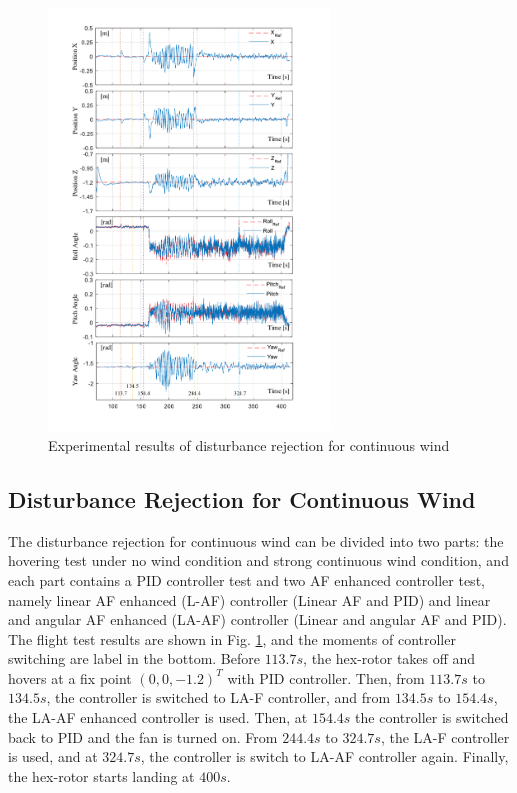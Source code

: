 \documentclass[letterpaper, 10 pt, conference]{ieeeconf}  %
\begin{document}
\begin{figure}[t]
    \centering
    \includegraphics[width=2.95in]{illustrations/fig14.pdf}
    \caption{ Experimental results of disturbance rejection for continuous wind}
    \label{f14}
\end{figure}

\subsection{Disturbance Rejection for Continuous Wind}

The disturbance rejection for continuous wind can be divided into two parts: the hovering test under no wind condition and strong continuous wind condition, and each part contains a PID controller test and two AF enhanced controller test, namely linear AF enhanced (L-AF) controller (Linear AF and PID) and linear and angular AF enhanced (LA-AF) controller (Linear and angular AF and PID).
The flight test results are shown in Fig. \ref{f14}, and the moments of controller switching are label in the bottom.
Before $113.7s$, the hex-rotor takes off and hovers at a fix point $(0,0,-1.2)^T$ with PID controller.
Then, from $113.7s$ to $134.5s$, the controller is switched to LA-F controller, and from $134.5s$ to $154.4s$, the LA-AF enhanced controller is used.
Then, at $154.4s$ the controller is switched back to PID and the fan is turned on.
From $244.4s$ to $324.7s$, the LA-F controller is used, and at $324.7s$, the controller is switch to LA-AF controller again.
Finally, the hex-rotor starts landing at $400s$.
\end{document}
